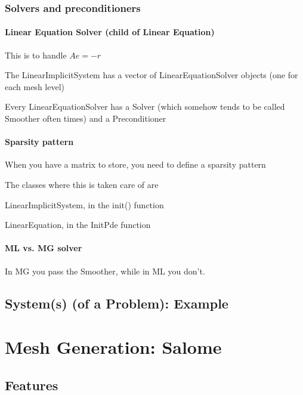 \documentclass[10pt]{book}
\begin{document}
     
     
     
      
      
\section{Solvers and preconditioners}



 \subsection{Linear Equation Solver (child of Linear Equation)}
 
 This is to handle $ A e = - r $
 
 The LinearImplicitSystem has a vector of LinearEquationSolver objects (one for each mesh level)
 
 Every LinearEquationSolver has a Solver (which somehow tends to be called Smoother often times) and a Preconditioner
 
 \subsection{Sparsity pattern}
 
  When you have a matrix to store, you need to define a sparsity pattern
  
  The classes where this is taken care of are 
  
  LinearImplicitSystem, in the init() function
  
  LinearEquation, in the InitPde function
  
  
 
  
 \subsection{ML vs. MG solver}

 In MG you pass the Smoother, while in ML you don't.
 
   \chapter{System(s) (of a Problem): Example}

 
\part{Mesh Generation: Salome}


\chapter{Features}
\end{document}
